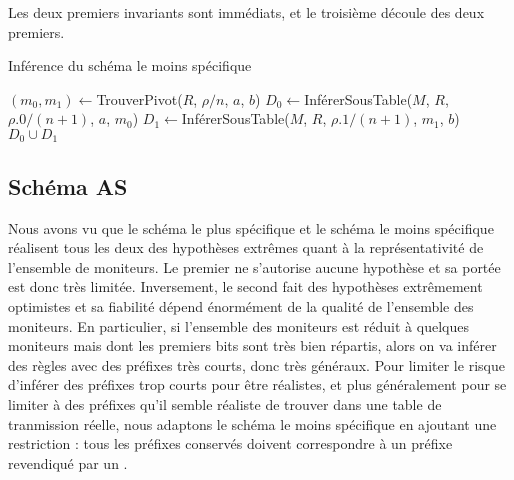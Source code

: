 Les deux premiers invariants sont immédiats, et le troisième découle des deux
premiers.

\begin{algorithm}
\caption{Inférence du schéma le moins spécifique}
\label{alg:revtables-inference-least-specific}
\begin{algorithmic}
\EndFunction
{}
\EndFunction
{}
\Else
	\State $(m_0, m_1) \gets ${\sc TrouverPivot}($R$, $\rho/n$, $a$, $b$)
	\State $D_0 \gets ${\sc InférerSousTable}($M$, $R$, $\rho.0/(n+1)$, $a$, $m_0$)
	\State $D_1 \gets ${\sc InférerSousTable}($M$, $R$, $\rho.1/(n+1)$, $m_1$, $b$)
	 $D_0 \cup D_1$
\EndIf
\EndFunction
{}
\EndFunction
\end{algorithmic}
\end{algorithm}

\subsection{Schéma AS}
\label{subsec:revtables-inference-as}

Nous avons vu que le schéma le plus spécifique et le schéma le moins spécifique
réalisent tous les deux des hypothèses extrêmes quant à la représentativité de
l'ensemble de moniteurs. Le premier ne s'autorise aucune hypothèse et sa portée
est donc très limitée. Inversement, le second fait des hypothèses extrêmement
optimistes et sa fiabilité dépend énormément de la qualité de l'ensemble des
moniteurs. En particulier, si l'ensemble des moniteurs est réduit à quelques
moniteurs mais dont les premiers bits sont très bien répartis, alors on va
inférer des règles avec des préfixes très courts, donc très généraux. Pour
limiter le risque d'inférer des préfixes trop courts pour être réalistes, et
plus généralement pour se limiter à des préfixes qu'il semble réaliste de
trouver dans une table de tranmission réelle, nous adaptons le schéma le moins
spécifique en ajoutant une restriction : tous les préfixes conservés doivent
correspondre à un préfixe revendiqué par un \as.

